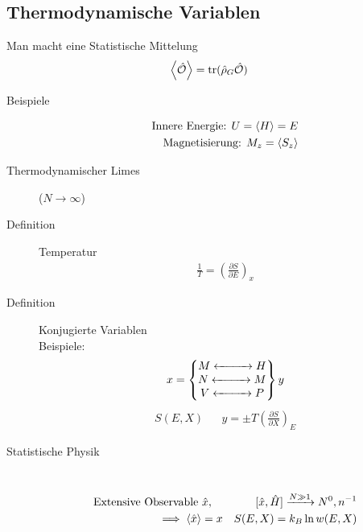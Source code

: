 \documentclass[11pt]{article}
\theoremstyle{plain}
\theoremstyle{mytheoremstyle}
\newcommand{\pd}[2]{\frac{\partial #1 }{\partial #2}}
\newcommand{\trace}{\operatorname{tr}}
\begin{document}
 \subsection*{Thermodynamische Variablen}
 Man macht eine Statistische Mittelung
 \begin{align*}
   \Braket{\hat{\cal{O}}} = \trace (\hat{\rho}_G \hat{\cal{O}})
 \end{align*}
 \begin{description}
   \item[Beispiele] 
     \begin{align*}
      \text{Innere Energie: } U= \Braket{H} = E \\
      \text{Magnetisierung: } M_z = \Braket{S_z} \\
     \end{align*}
   \item[Thermodynamischer Limes] ($N \to \infty$)
   \item[Definition] Temperatur
     \begin{align*}
       \frac{1}{T} = \left( \pd{S}{E} \right)_x
     \end{align*}
   \item[Definition] Konjugierte Variablen \\
     Beispiele: 
     \begin{align*}
       x = \begin{Bmatrix} 
         M \xleftrightarrow{\hspace{1cm}}  H \\ 
         N \xleftrightarrow{\hspace{1cm}}  M \\
         V \xleftrightarrow{\hspace{1cm}} P 
     \end{Bmatrix} y
     \end{align*}
     \begin{align*}
       S(E,X) && y = \pm  T \left( \pd{S}{X} \right)_E
     \end{align*}
   \item[Statistische Physik] $ $ \\
     \begin{align*}
       \text{Extensive Observable } \hat{x}, \quad && [\hat{x}, \hat{H}]
       \xrightarrow{ N \gg 1} N^0, n^{-1} \\
       \implies \Braket{\hat{x}} = x && S(E,X) = k_B \ln{ w(E,X)} \\
     \end{align*}
 \end{description}
\end{document}
